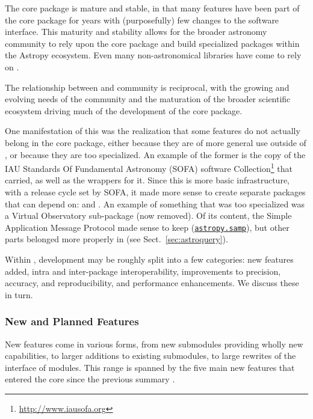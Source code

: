 \documentclass[modern]{aastex631}
\newcommand{\astropysubpkg}[1]{\href{http://docs.astropy.org/en/stable/#1/index.html}{\texttt{astropy.#1}}\xspace}
\begin{document}
  The \astropypkg core package is mature and stable, in that many features have
  been part of the core package for years with (purposefully) few changes to the
  software interface. This maturity and stability allows for the broader
  astronomy \python community to rely upon the \astropypkg core package and
  build specialized packages within the Astropy ecosystem. Even many
  non-astronomical \python libraries have come to rely on \astropypkg.

  The relationship between \astropy and community is reciprocal, with the
  growing and evolving needs of the community and the maturation of the broader
  scientific \python ecosystem driving much of the development of the
  \astropypkg core package.

  One manifestation of this was the realization that some features do not
  actually belong in the core package, either because they are of more general
  use outside of \astropypkg, or because they are too specialized. An example of
  the former is the copy of the IAU Standards Of Fundamental Astronomy (SOFA)
  software Collection\footnote{\url{http://www.iausofa.org}} \citep{sofa} that
  \astropy carried, as well as the \python wrappers for it.  Since this is more
  basic infrastructure, with a release cycle set by SOFA, it made more sense to
  create separate packages that \astropypkg can depend on: 
  \citep{erfa} and  \citep{pyerfa}. An example of something that
  was too specialized was a Virtual Observatory sub-package (now removed).  Of
  its content, the Simple Application Message Protocol made sense to keep
  (\astropysubpkg{samp}), but other parts belonged more properly in  (see Sect.~\ref{sec:astroquery}).

  Within \astropypkg, development may be roughly split into a few categories:
  new features added, intra and inter-package interoperability, improvements to
  precision, accuracy, and reproducibility, and performance enhancements. We
  discuss these in turn.


\subsubsection*{New and Planned Features} \label{sec:core-features-new}

New features come in various forms, from new submodules providing
wholly new capabilities, to larger additions to existing submodules,
to large rewrites of the interface of modules.  This range is spanned
by the five main new features that entered the \astropypkg core since the
previous summary .
\end{document}
